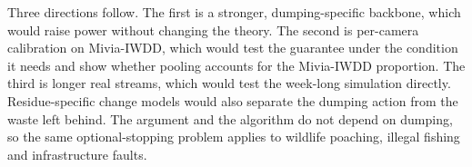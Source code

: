 Three directions follow. The first is a stronger, dumping-specific backbone, which would raise power without changing the theory. The second is per-camera calibration on Mivia-IWDD, which would test the guarantee under the condition it needs and show whether pooling accounts for the Mivia-IWDD proportion. The third is longer real streams, which would test the week-long simulation directly. Residue-specific change models would also separate the dumping action from the waste left behind. The argument and the algorithm do not depend on dumping, so the same optional-stopping problem applies to wildlife poaching, illegal fishing and infrastructure faults.
